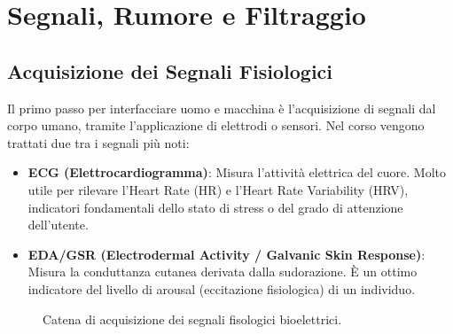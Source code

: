 \chapter{Segnali, Rumore e Filtraggio}

\section{Acquisizione dei Segnali Fisiologici}
Il primo passo per interfacciare uomo e macchina è l'acquisizione di segnali dal corpo umano, tramite l'applicazione di elettrodi o sensori. Nel corso vengono trattati due tra i segnali più noti:
\begin{itemize}
    \item \textbf{ECG (Elettrocardiogramma)}: Misura l'attività elettrica del cuore. Molto utile per rilevare l'Heart Rate (HR) e l'Heart Rate Variability (HRV), indicatori fondamentali dello stato di stress o del grado di attenzione dell'utente.
    \item \textbf{EDA/GSR (Electrodermal Activity / Galvanic Skin Response)}: Misura la conduttanza cutanea derivata dalla sudorazione. È un ottimo indicatore del livello di arousal (eccitazione fisiologica) di un individuo.
\end{itemize}

\begin{figure}[h!]
    \centering
    \caption{Catena di acquisizione dei segnali fisologici bioelettrici.}
\end{figure}

